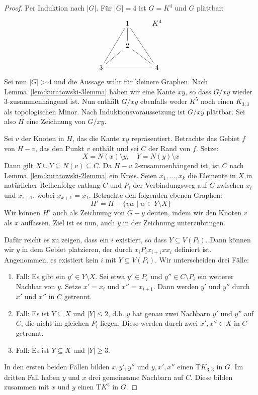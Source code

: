 \documentclass[10pt,b5paper]{article}
\begin{document}
\begin{proof}
Per Induktion nach $|G|$. Für $|G|=4$ ist $G = K^4$ und $G$ plättbar:
\[\begin{tikzcd}
& 1\ar[d, -]\ar[ldd, -]\ar[rdd, -] & K^4\\
& 2\ar[ld, -]\ar[rd, -] & \\
3\ar[rr, -] & & 4
\end{tikzcd}\]
Sei nun $|G|>4$ und die Aussage wahr für kleinere Graphen. Nach Lemma~\ref{lem:kuratowski-3lemma} haben wir eine Kante $xy$, so dass $G/xy$ wieder $3$-zusammenhängend ist. Nun enthält $G/xy$ ebenfalls weder $K^5$ noch einen $K_{3,3}$ als topologischen Minor. Nach Induktionsvoraussetzung ist $G/xy$ plättbar. Sei also $H$ eine Zeichnung von $G/xy$.

Sei $v$ der Knoten in $H$, das die Kante $xy$ repräsentiert. Betrachte das Gebiet $f$ von $H-v$, das den Punkt $v$ enthält und sei $C$ der Rand von $f$. Setze:
\[ X = N(x) \setminus{y},\quad Y = N(y)\setminus{x} \]
Dann gilt $X\cup Y\subseteq N(v)\subseteq C$. Da $H-v$ $2$-zusammenhängend ist, ist $C$ nach Lemma~\ref{lem:kuratowski-2lemma} ein Kreis. Seien $x_1,\ldots, x_k$ die Elemente in $X$ in natürlicher Reihenfolge entlang $C$ und $P_i$ der Verbindungsweg auf $C$ zwischen $x_i$ und $x_{i+1}$, wobei $x_{k+1} = x_1$. Betrachte den folgenden ebenen Graphen:
\[ H' = H - \{vw \mid w\in Y\setminus X\} \]
Wir können $H'$ auch als Zeichnung von $G-y$ deuten, indem wir den Knoten $v$ als $x$ auffassen. Ziel ist es nun, auch $y$ in der Zeichnung unterzubringen. 

Dafür reicht es zu zeigen, dass ein $i$ existiert, so dass $Y\subseteq V(P_i)$. Dann können wir $y$ in dem Gebiet platzieren, der durch $x_i P_i x_{i+1} x x_i$ definiert ist. Angenommen, es existiert kein $i$ mit $Y\subseteq V(P_i)$. Wir unterscheiden drei Fälle:
\begin{enumerate}
\item Fall: Es gibt ein $y'\in Y\setminus X$. Sei etwa $y'\in P_i$ und $y''\in C\setminus P_i$ ein weiterer Nachbar von $y$. Setze $x'=x_i$ und $x''=x_{i+1}$. Dann werden $y'$ und $y''$ durch $x'$ und $x''$ in $C$ getrennt.
\item Fall: Es ist $Y\subseteq X$ und $|Y| \leq 2$, d.h. $y$ hat genau zwei Nachbarn $y'$ und $y''$ auf $C$, die nicht im gleichen $P_i$ liegen. Diese werden durch zwei $x',x''\in X$ in $C$ getrennt.
\item Fall: Es ist $Y\subseteq X$ und $|Y|\geq 3$.
\end{enumerate}
In den ersten beiden Fällen bilden $x,y',y''$ und $y,x',x''$ einen $\mathrm{T}K_{3,3}$ in $G$. Im dritten Fall haben $y$ und $x$ drei gemeinsame Nachbarn auf $C$. Diese bilden zusammen mit $x$ und $y$ einen $\mathrm{T}K^5$ in $G$.
\end{proof}
\end{document}
